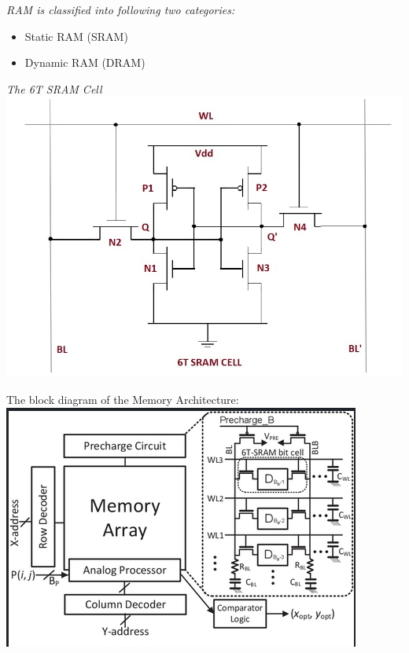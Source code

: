 \documentclass[12pt, letterpaper]{article}
\begin{document}
\emph{RAM is classified into following two categories:}
\begin{itemize}
    \item Static RAM (SRAM)
    \item Dynamic RAM (DRAM)
\end{itemize}

\emph{The 6T SRAM Cell} \\
\includegraphics [scale=0.5]{sram-cell}

The block diagram of the Memory Architecture: \\
\includegraphics[scale=0.7]{det_mem_arch}
\end{document}

